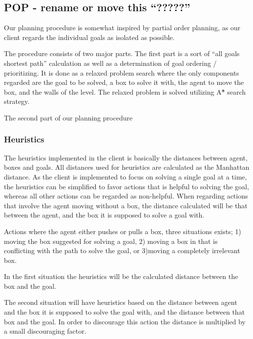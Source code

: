 \documentclass[Main]{subfiles}
\begin{document}
\subsection{POP - rename or move this ``?????'' }

Our planning procedure is somewhat inspired by partial order planning, as our client regards the individual goals as isolated as possible. 

The procedure consists of two major parts. The first part is a sort of ``all goals shortest path'' calculation as well as a determination of goal ordering / prioritizing. 
It is done as a relaxed problem search where the only components regarded are the goal to be solved, a box to solve it with, the agent to move the box, and the walls of the level. The relaxed problem is solved utilizing A\^{*} search strategy. 

The second part of our planning procedure  




\subsubsection{Heuristics}
The heuristics implemented in the client is basically the distances between agent, boxes and goals. All distances used for heuristics are calculated as the Manhattan distance.  As the client is implemented to focus on solving a single goal at a time, the heuristics can be simplified to favor actions that is helpful to solving the goal, whereas all other actions can be regarded as non-helpful. 
When regarding actions that involve the agent moving without a box, the distance calculated will be that between the agent, and the box it is supposed to solve a goal with. 

Actions where the agent either pushes or pulls a box, three situations exists; 1) moving the box suggested for solving a goal, 2) moving a box in that is conflicting with the path to solve the goal, or 3)moving a completely irrelevant box. 

In the first situation the heuristics will be the calculated distance between the box and the goal.

The second situation will have heuristics based on the distance between agent and the box it is supposed to solve the goal with, and the distance between that box and the goal. In order to discourage this action the distance is multiplied by a small discouraging factor.
\end{document}
